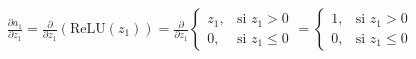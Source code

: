 \documentclass[preview]{standalone}
\begin{document}
\begin{align*}
\frac{\partial a_1}{\partial z_1} =  \frac{\partial}{\partial z_1}(\text{ReLU}(z_1)) =\frac{\partial}{\partial z_1}\begin{cases} z_1, & \text{si } z_1 > 0 \\ 0, & \text{si } z_1 \leq 0 \end{cases}	 =  \begin{cases} 1, & \text{si } z_1 > 0 \\ 0, & \text{si } z_1 \leq 0 \end{cases}
\end{align*}
\end{document}
